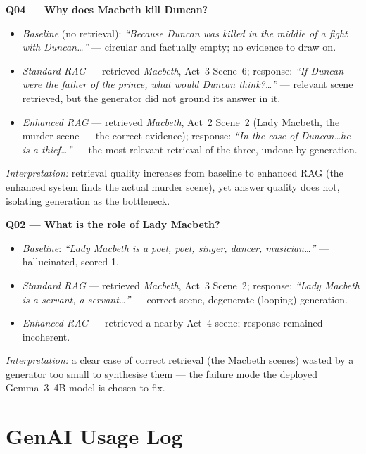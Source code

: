 \noindent\textbf{Q04 --- Why does Macbeth kill Duncan?}
\begin{itemize}
  \item \emph{Baseline} (no retrieval): \textit{``Because Duncan was
  killed in the middle of a fight with Duncan\dots''} --- circular and
  factually empty; no evidence to draw on.
  \item \emph{Standard RAG} --- retrieved \emph{Macbeth}, Act~3 Scene~6;
  response: \textit{``If Duncan were the father of the prince, what would
  Duncan think?\dots''} --- relevant scene retrieved, but the generator
  did not ground its answer in it.
  \item \emph{Enhanced RAG} --- retrieved \emph{Macbeth}, Act~2 Scene~2
  (Lady Macbeth, the murder scene --- the correct evidence); response:
  \textit{``In the case of Duncan\dots he is a thief\dots''} --- the most
  relevant retrieval of the three, undone by generation.
\end{itemize}
\emph{Interpretation:} retrieval quality increases from baseline to
enhanced RAG (the enhanced system finds the actual murder scene), yet
answer quality does not, isolating generation as the bottleneck.

\noindent\textbf{Q02 --- What is the role of Lady Macbeth?}
\begin{itemize}
  \item \emph{Baseline}: \textit{``Lady Macbeth is a poet, poet, singer,
  dancer, musician\dots''} --- hallucinated, scored 1.
  \item \emph{Standard RAG} --- retrieved \emph{Macbeth}, Act~3 Scene~2;
  response: \textit{``Lady Macbeth is a servant, a servant\dots''} ---
  correct scene, degenerate (looping) generation.
  \item \emph{Enhanced RAG} --- retrieved a nearby Act~4 scene; response
  remained incoherent.
\end{itemize}
\emph{Interpretation:} a clear case of correct retrieval (the Macbeth
scenes) wasted by a generator too small to synthesise them --- the
failure mode the deployed Gemma~3~4B model is chosen to fix.

\section{GenAI Usage Log}
\label{app:genai-log}

